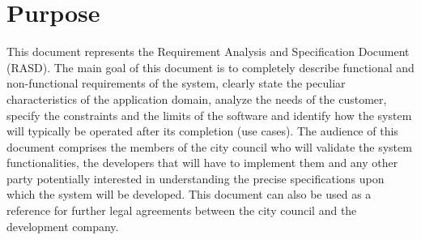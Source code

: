 \section{Purpose}
This document represents the Requirement Analysis and Specification Document (RASD). The main goal of this document is to completely describe functional and non-functional requirements of the system, clearly state the peculiar characteristics of the application domain, analyze the needs of the customer, specify the constraints and the limits of the software and identify how the system will typically be operated after its completion (use cases). The audience of this document comprises the members of the city council who will validate the system functionalities, the developers that will have to implement them and any other party potentially interested in understanding the precise specifications upon which the system will be developed. This document can also be used as a reference for further legal agreements between the city council and the development company.


